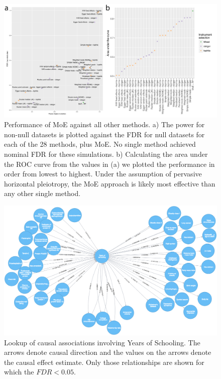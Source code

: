 \documentclass[]{article}
\begin{document}
\newpage

\begin{figure}
\centering
\includegraphics{images/fig3.pdf}
\caption{Performance of MoE against all other methods. a) The power for
non-null datasets is plotted against the FDR for null datasets for each
of the 28 methods, plus MoE. No single method achieved nominal FDR for
these simulations. b) Calculating the area under the ROC curve from the
values in (a) we plotted the performance in order from lowest to
highest. Under the assumption of pervasive horizontal pleiotropy, the
MoE approach is likely most effective than any other single method.}
\end{figure}

\newpage

\begin{figure}
\centering
\includegraphics{images/fig4.png}
\caption{Lookup of causal associations involving Years of Schooling. The
arrows denote causal direction and the values on the arrows denote the
causal effect estimate. Only those relationships are shown for which the
\(FDR < 0.05\).}
\end{figure}
\end{document}
